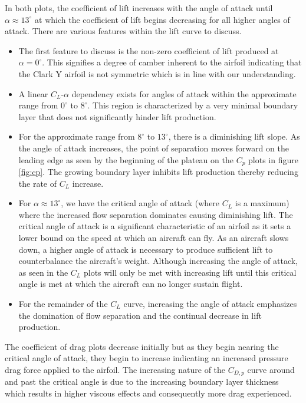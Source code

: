 \documentclass[runningheads]{llncs}
\begin{document}
\noindent
In both plots, the coefficient of lift increases with the angle of attack until $\alpha\approx13^\circ$ at which the coefficient of lift begins decreasing for all higher angles of attack. There are various features within the lift curve to discuss.

\begin{itemize}

    \item The first feature to discuss is the non-zero coefficient of lift produced at $\alpha=0^\circ$. This signifies a degree of camber inherent to the airfoil indicating that the Clark Y airfoil is not symmetric which is in line with our understanding.
    
    \item A linear $C_L$-$\alpha$ dependency exists for angles of attack within the approximate range from $0^\circ$ to $8^\circ$. This region is characterized by a very minimal boundary layer that does not significantly hinder lift production.
    
    \item For the approximate range from $8^\circ$ to $13^\circ$, there is a diminishing lift slope. As the angle of attack increases, the point of separation moves forward on the leading edge as seen by the beginning of the plateau on the $C_p$ plots in figure \ref{fig:cp}. The growing boundary layer inhibits lift production thereby reducing the rate of $C_L$ increase.
    
    \item For $\alpha\approx13^\circ$, we have the critical angle of attack (where $C_L$ is a maximum) where the increased flow separation dominates causing diminishing lift. The critical angle of attack is a significant characteristic of an airfoil as it sets a lower bound on the speed at which an aircraft can fly. As an aircraft slows down, a higher angle of attack is necessary to produce sufficient lift to counterbalance the aircraft's weight. Although increasing the angle of attack, as seen in the $C_L$ plots will only be met with increasing lift until this critical angle is met at which the aircraft can no longer sustain flight.
    
    \item For the remainder of the $C_L$ curve, increasing the angle of attack emphasizes the domination of flow separation and the continual decrease in lift production.
\end{itemize}

\noindent
The coefficient of drag plots decrease initially but as they begin nearing the critical angle of attack, they begin to increase indicating an increased pressure drag force applied to the airfoil. The increasing nature of the $C_{D,p}$ curve around and past the critical angle is due to the increasing boundary layer thickness which results in higher viscous effects and consequently more drag experienced.\newline
\end{document}
